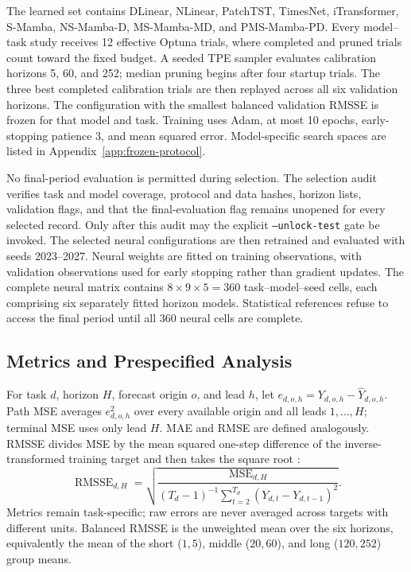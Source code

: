 The learned set contains DLinear, NLinear, PatchTST, TimesNet, iTransformer, S-Mamba, NS-Mamba-D, MS-Mamba-MD, and PMS-Mamba-PD.
Every model--task study receives 12 effective Optuna trials, where completed and pruned trials count toward the fixed budget.
A seeded TPE sampler evaluates calibration horizons 5, 60, and 252; median pruning begins after four startup trials.
The three best completed calibration trials are then replayed across all six validation horizons.
The configuration with the smallest balanced validation RMSSE is frozen for that model and task.
Training uses Adam, at most 10 epochs, early-stopping patience 3, and mean squared error.
Model-specific search spaces are listed in Appendix~\ref{app:frozen-protocol}.

No final-period evaluation is permitted during selection.
The selection audit verifies task and model coverage, protocol and data hashes, horizon lists, validation flags, and that the final-evaluation flag remains unopened for every selected record.
Only after this audit may the explicit \texttt{--unlock-test} gate be invoked.
The selected neural configurations are then retrained and evaluated with seeds 2023--2027.
Neural weights are fitted on training observations, with validation observations used for early stopping rather than gradient updates.
The complete neural matrix contains $8\times9\times5=360$ task--model--seed cells, each comprising six separately fitted horizon models.
Statistical references refuse to access the final period until all 360 neural cells are complete.

\subsection{Metrics and Prespecified Analysis}

For task $d$, horizon $H$, forecast origin $o$, and lead $h$, let $e_{d,o,h}=Y_{d,o,h}-\hat{Y}_{d,o,h}$.
Path MSE averages $e_{d,o,h}^2$ over every available origin and all leads $1,\ldots,H$; terminal MSE uses only lead $H$.
MAE and RMSE are defined analogously.
RMSSE divides MSE by the mean squared one-step difference of the inverse-transformed training target and then takes the square root \cite{m5}:
\begin{equation}
    \operatorname{RMSSE}_{d,H}=
    \sqrt{\frac{\operatorname{MSE}_{d,H}}
    {(T_d-1)^{-1}\sum_{t=2}^{T_d}(Y_{d,t}-Y_{d,t-1})^2}}.
\end{equation}
Metrics remain task-specific; raw errors are never averaged across targets with different units.
Balanced RMSSE is the unweighted mean over the six horizons, equivalently the mean of the short ($1,5$), middle ($20,60$), and long ($120,252$) group means.

